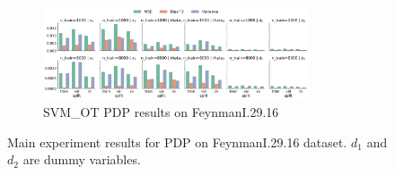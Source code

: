 \documentclass[runningheads]{llncs}
\begin{document}
\begin{figure}[ht]
\begin{subfigure}[b]{\textwidth}
        \centering
        \includegraphics[width=0.86\textwidth]{img/FeynmanI.29.16-all/feature_effect_errors_pdp_SVM_OT.png}
        \caption{SVM\_OT PDP results on FeynmanI.29.16}
    \end{subfigure}
    \caption{Main experiment results for PDP on FeynmanI.29.16 dataset. $d_1$ and $d_2$ are dummy variables.}
    \label{fig:pdp-results-feynman}  %
\end{figure}
\end{document}

